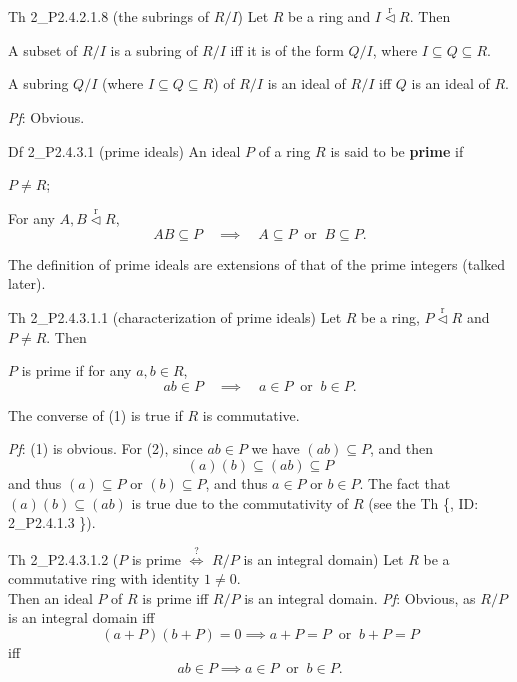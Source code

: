 \documentclass{article}
\newcommand{\nles}{\vartriangleleft}
\newcommand{\ideal}{\overset{\text{r}}{\nles}} %
\begin{document}
\begin{Th}{Th 2\_P2.4.2.1.8 (the subrings of $R/I$)}
    Let $R$ be a ring and $I\ideal R$. Then
    \begin{compactenum}
        \item A subset of $R/I$ is a subring of $R/I$ iff it is of the form $Q/I$, where $I\subseteq Q\subseteq R$.
        \item A subring $Q/I$ (where $I\subseteq Q\subseteq R$) of $R/I$ is an ideal of $R/I$ iff $Q$ is an ideal of $R$.
    \end{compactenum}
    \tcblower
    \textit{Pf}: Obvious.
\end{Th}

\begin{Df}{Df 2\_P2.4.3.1 (prime ideals)}
    An ideal $P$ of a ring $R$ is said to be \textbf{prime} if
    \begin{compactenum}
        \item $P\neq R$;
        \item For any $A, B\ideal R$, 
        $$ AB\subseteq P \quad\implies\quad A\subseteq P \;\;\text{or}\;\; B\subseteq P. $$
    \end{compactenum}
\end{Df}

\begin{Rmk}{}
    The definition of prime ideals are extensions of that of the prime integers (talked later).
\end{Rmk}

\begin{Th}{Th 2\_P2.4.3.1.1 (characterization of prime ideals)}
    Let $R$ be a ring, $P\ideal R$ and $P\neq R$. Then
    \begin{compactenum}
        \item[(1)] $P$ is prime if for any $a, b\in R$, 
        $$ ab\in P \quad\implies\quad a\in P \;\;\text{or}\;\; b\in P. $$
        \item[(2)] The converse of (1) is true if $R$ is commutative.
    \end{compactenum}
    \tcblower
    \textit{Pf}: (1) is obvious. For (2), since $ab\in P$ we have $(ab)\subseteq P$, and then
    $$ (a)(b) \subseteq (ab) \subseteq P $$
    and thus $(a)\subseteq P$ or $(b)\subseteq P$, and thus $a\in P$ or $b\in P$. The fact that $(a)(b)\subseteq (ab)$ is true due to the commutativity of $R$ (see the Th \{, ID: 2\_P2.4.1.3 \}).
\end{Th}

\begin{Th}{Th 2\_P2.4.3.1.2 ($P$ is prime $\overset{?}{\Longleftrightarrow}$ $R/P$ is an integral domain)}
    Let $R$ be a commutative ring with identity $1\neq 0$. \\
    Then an ideal $P$ of $R$ is prime iff $R/P$ is an integral domain.
    \tcblower
    \textit{Pf}: Obvious, as $R/P$ is an integral domain iff
    $$ (a+P)(b+P) = 0 \implies a+P = P \;\;\text{or}\;\; b+P = P $$
    iff
    $$ ab\in P \implies a\in P \;\;\text{or}\;\; b\in P. $$
\end{Th}
\end{document}
